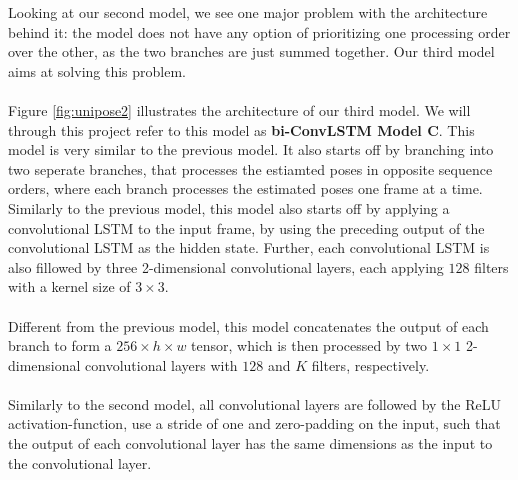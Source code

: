 \documentclass[./main.tex]{subfiles}
\begin{document}
\noindent Looking at our second model, we see one major problem with the architecture behind it: the model does not have any option of prioritizing one processing order over the other, as the two branches are just summed together. Our third model aims at solving this problem.
\\
\\
Figure \ref{fig:unipose2} illustrates the architecture of our third model. We will through this project refer to this model as \textbf{bi-ConvLSTM Model C}. This model is very similar to the previous model. It also starts off by branching into two seperate branches, that processes the estiamted poses in opposite sequence orders, where each branch processes the estimated poses one frame at a time. Similarly to the previous model, this model also starts off by applying a convolutional LSTM to the input frame, by using the preceding output of the convolutional LSTM as the hidden state. Further, each convolutional LSTM is also fillowed by three 2-dimensional convolutional layers, each applying $128$ filters with a kernel size of $3 \times 3$. 
\\
\\
Different from the previous model, this model concatenates the output of each branch to form a $256 \times h \times w$ tensor, which is then processed by two $1 \times 1$ 2-dimensional convolutional layers with $128$ and $K$ filters, respectively.
\\
\\
Similarly to the second model, all convolutional layers are followed by the ReLU activation-function, use a stride of one and zero-padding on the input, such that the output of each convolutional layer has the same dimensions as the input to the convolutional layer.
\end{document}
